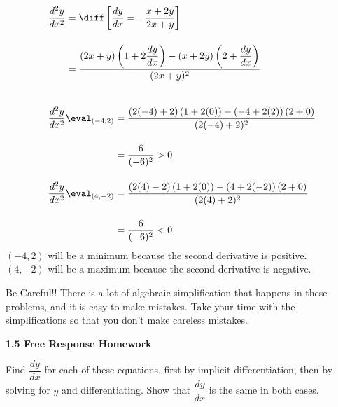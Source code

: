 \begin{tcolorbox}[solution]
\begin{align*}
        & \dfrac{d^2y}{dx^2} \begin{aligned}[t]
            & = \diff \left[\dfrac{dy}{dx} = -\dfrac{x + 2y}{2x + y}\right] \\[11pt]
            & = \dfrac{(2x + y)\left(1 + 2\dfrac{dy}{dx}\right) - (x + 2y)\left(2 + \dfrac{dy}{dx}\right)}{(2x + y)^2} \\[11pt]
        \end{aligned} \\[11pt]
        & \dfrac{d^2y}{dx^2} \eval_{(-4, 2)} \begin{aligned}[t]
            & = \dfrac{(2(-4) + 2)\left(1 + 2(0)\right) - (-4 + 2(2))\left(2 + 0\right)}{(2(-4) + 2)^2} \\[11pt]
            & = \dfrac{6}{(-6)^2} > 0
        \end{aligned} \\[11pt]
        & \dfrac{d^2y}{dx^2} \eval_{(4, -2)} \begin{aligned}[t]
            & = \dfrac{(2(4) - 2)\left(1 + 2(0)\right) - (4 + 2(-2))\left(2 + 0\right)}{(2(4) + 2)^2} \\[11pt]
            & = \dfrac{6}{(-6)^2} < 0
        \end{aligned}
    \end{align*}
    $\boxed{(-4, 2) \text{ will be a minimum}}$ because the second derivative is positive. \\[11pt]
    $\boxed{(4, -2) \text{ will be a maximum}}$ because the second derivative is negative.
\end{tcolorbox}

Be Careful!! There is a lot of algebraic simplification that happens in these problems, and it is easy to make mistakes. Take your time with the simplifications so that you don't make careless mistakes. \par

\newpage

\textbf{\large{1.5 Free Response Homework}} \par

Find $\dfrac{dy}{dx}$ for each of these equations, first by implicit differentiation, then by solving for $y$ and differentiating. Show that $\dfrac{dy}{dx}$ is the same in both cases. \par

 \\[11pt]
 \\[11pt]

